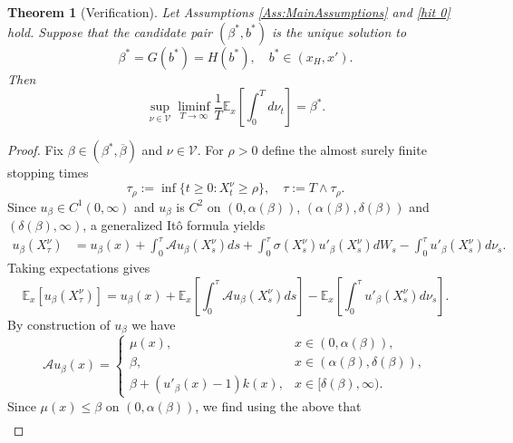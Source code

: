 \documentclass[12pt]{article}
\newtheorem{theorem}{Theorem}[section]
\begin{document}
\begin{theorem}[Verification]
Let Assumptions \ref{Ass:MainAssumptions} and \ref{hit 0} hold. Suppose that the candidate pair $(\beta^*,b^*)$ is the unique solution to
\begin{equation*}
    \beta^*=G(b^*)=H(b^*), \quad b^* \in (x_H,x').
\end{equation*}
Then 
\begin{equation*}
  \sup_{\nu \in \mathcal V}  \liminf_{T \to \infty}\frac{1}{T} \mathbb{E}_x \left[ \int_0^T d \nu_t \right] = \beta^*.
\end{equation*}
\end{theorem}

\begin{proof}
Fix $\beta \in (\beta^*, \overline{\beta})$ and $\nu \in \mathcal V$. For $\rho > 0$ define the almost surely finite stopping times
\begin{equation*}
    \tau_\rho:=\inf\{t\ge 0: X_t^\nu \geq \rho\}, \quad \tau:= T \wedge \tau_\rho.
\end{equation*}
Since $u_\beta \in C^1(0,\infty)$ and $u_\beta$ is $C^2$ on $(0,\alpha(\beta))$, $(\alpha(\beta),\delta(\beta))$ and $(\delta(\beta),\infty)$, a generalized It\^o formula yields
\begin{align*}
    u_\beta(X^\nu_{\tau})
    &=u_\beta(x)
    +\int_0^{\tau}\mathcal A u_\beta(X_s^\nu) ds
    +\int_0^{\tau}\sigma(X_s^\nu)u'_\beta(X_s^\nu) dW_s
    -\int_0^{\tau}u'_\beta(X_s^\nu) d\nu_s .
\end{align*}
Taking expectations gives
\begin{equation} \label{Eq:Itoub}
    \mathbb{E}_x [u_\beta(X^\nu_{\tau})]
    =u_\beta(x)+\mathbb{E}_x \left[\int_0^{\tau} \mathcal A u_\beta(X_s^\nu) ds \right]
    -\mathbb{E}_x \left[\int_0^{\tau} u'_\beta(X_s^\nu) d\nu_s \right].
\end{equation}
By construction of $u_\beta$ we have
\begin{equation*}
    \mathcal A u_\beta(x) = 
    \begin{cases}
        \mu(x), & x\in(0,\alpha(\beta)), \\
        \beta, & x\in(\alpha(\beta),\delta(\beta)), \\
        \beta+(u'_\beta(x)-1)k(x), &  x \in [\delta(\beta), \infty).
    \end{cases}
\end{equation*}
Since $\mu(x) \leq \beta$ on $(0, \alpha(\beta))$, we find using the above that
\begin{align*}

\end{align*}
\end{proof}
\end{document}
